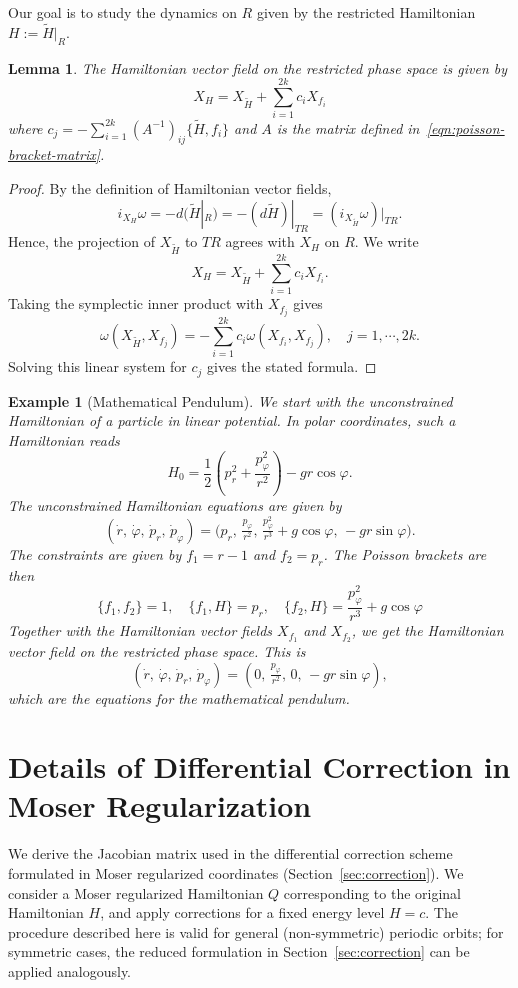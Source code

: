 \documentclass[pdflatex,sn-mathphys-ay]{sn-jnl}%
\theoremstyle{thmstyleone}%
\newtheorem{lemma}[theorem]{Lemma}%
\theoremstyle{thmstyletwo}%
\newtheorem{example}{Example}%
\theoremstyle{thmstylethree}%
\renewcommand{\phi}{\varphi}
\begin{document}
Our goal is to study the dynamics on $R$ given by the restricted Hamiltonian $H := \tilde{H}|_{R}$.
\begin{lemma}
\label{lem:restricted_ham_vf}
The Hamiltonian vector field on the restricted phase space is given by
\[
X_H = X_{\tilde{H}} + \sum_{i=1}^{2k} c_i X_{f_i}
\]
where  
$
c_j = - \sum_{i=1}^{2k} \left(A^{-1}\right)_{ij} \{\tilde{H}, f_i\}
$
and $A$ is the matrix defined in~\eqref{eqn:poisson-bracket-matrix}.
\end{lemma}
\begin{proof}
    By the definition of Hamiltonian vector fields,
    \[
        i_{X_H}\omega = -d(\tilde{H}|_R) = -(d\tilde{H})|_{TR} = (i_{X_{\tilde{H}}} \omega)|_{TR}.
    \]
    Hence, the projection of $X_{\tilde{H}}$ to $TR$ agrees with $X_{H}$ on $R$. We write 
    \[
        X_H = X_{\tilde{H}} + \sum_{i=1}^{2k} c_i X_{f_i}.
    \]
    Taking the symplectic inner product with $X_{f_j}$ gives
    \[
        \omega(X_{\tilde{H}}, X_{f_j}) = -\sum_{i=1}^{2k} c_i \omega(X_{f_i}, X_{f_j}), \quad j=1,\cdots, 2k.
    \]
    Solving this linear system for $c_j$ gives the stated formula.
\end{proof}

\begin{example}[Mathematical Pendulum]
We start with the unconstrained Hamiltonian of a particle in linear potential. In polar coordinates, such a Hamiltonian reads
\[
H_0=\frac{1}{2}(p_r^2+\frac{p_\phi^2}{r^2}) -g r\cos\phi.
\]
The unconstrained Hamiltonian equations are given by
\[
(\dot r,\, \dot \phi,\, \dot p_r,\, \dot p_\phi)
=
\bigl(p_r,\, \tfrac{p_\phi}{r^2},\, \tfrac{p_\phi^2}{r^3} + g\cos\phi,\, -g r \sin\phi\bigr).
\]
The constraints are given by $f_1=r-1$ and $f_2=p_r$. The Poisson brackets are then 
\[
\{ f_1, f_2 \} =1,\quad \{ f_1, H \} =p_r,\quad
\{ f_2, H \} = \frac{p_\phi^2}{r^3}+g\cos \phi
\]
Together with the Hamiltonian vector fields $X_{f_1}$ and $X_{f_2}$, we get the Hamiltonian vector field on the restricted phase space. This is
\[
(\dot r,\, \dot \phi,\, \dot p_r,\, \dot p_\phi)
=
(0,\, \tfrac{p_\phi}{r^2},\, 0,\, -g r \sin\phi),
\]
which are the equations for the mathematical pendulum.
\end{example}

\section{Details of Differential Correction in Moser Regularization}
\label{sec:df_derivation}

We derive the Jacobian matrix used in the differential correction scheme formulated in Moser regularized coordinates (Section~\ref{sec:correction}). We consider a Moser regularized Hamiltonian $Q$ corresponding to the original Hamiltonian $H$, and apply corrections for a fixed energy level $H = c$. The procedure described here is valid for general (non-symmetric) periodic orbits; for symmetric cases, the reduced formulation in Section~\ref{sec:correction} can be applied analogously.
\end{document}
